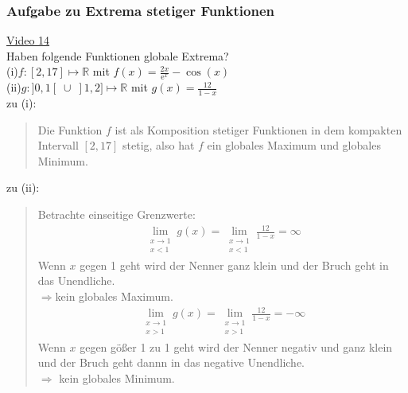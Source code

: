 \subsubsection{Aufgabe zu Extrema stetiger Funktionen}
\href{https://youtu.be/CkySz6nT0R8}{Video 14}\\
Haben folgende Funktionen globale Extrema?\\
(i)\;\;$ f:[2,17]\longmapsto \mathbb{R} $ mit $ f(x)=\frac{2x}{\mathrm{e}^x}-\cos(x) $\vspace*{2mm}\\
(ii)\;$ g:]0,1[\;\cup\;]1,2]\longmapsto \mathbb{R} $ mit $ g(x)= \frac{12}{1-x} $\vspace*{2mm}\\
zu (i):\\
\begin{quote}
	Die Funktion $ f $ ist als Komposition stetiger Funktionen in dem kompakten Intervall $[2,17]  $ stetig, also hat $ f $ ein globales Maximum und globales Minimum.
\end{quote}
zu (ii):\\
\begin{quote}
	Betrachte einseitige Grenzwerte:\\
	\begin{align*}
	\lim\limits_ {\substack{x \to 1 \\ x<1}}g(x)=\lim\limits_ {\substack{x \to 1 \\ x<1}} \frac{12}{1-x}=\infty
	\end{align*}
	Wenn $ x $ gegen 1 geht wird der Nenner ganz klein und der Bruch geht in das Unendliche.\\$ \Rightarrow $kein globales Maximum.
	\begin{align*}
	\lim\limits_ {\substack{x \to 1 \\ x>1}}g(x)=\lim\limits_ {\substack{x \to 1 \\ x>1}} \frac{12}{1-x}=-\infty
	\end{align*}
	Wenn $ x $ gegen gößer 1 zu 1 geht wird der Nenner negativ und ganz klein und der Bruch geht dannn in das negative Unendliche.\\
	$\Rightarrow $ kein globales Minimum.
\end{quote}
